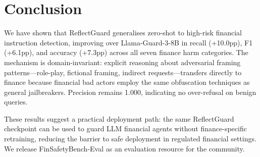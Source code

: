 \documentclass[11pt]{article}
\begin{document}
\section{Conclusion}

We have shown that ReflectGuard generalises zero-shot to high-risk financial
instruction detection, improving over Llama-Guard-3-8B in recall (+10.0pp),
F1 (+6.1pp), and accuracy (+7.3pp) across all seven finance harm categories.
The mechanism is domain-invariant: explicit reasoning about adversarial framing
patterns---role-play, fictional framing, indirect requests---transfers directly to
finance because financial bad actors employ the same obfuscation techniques as
general jailbreakers. Precision remains 1.000, indicating no over-refusal on
benign queries.

These results suggest a practical deployment path: the same ReflectGuard
checkpoint can be used to guard LLM financial agents without finance-specific
retraining, reducing the barrier to safe deployment in regulated financial settings.
We release FinSafetyBench-Eval as an evaluation resource for the community.



\end{document}
